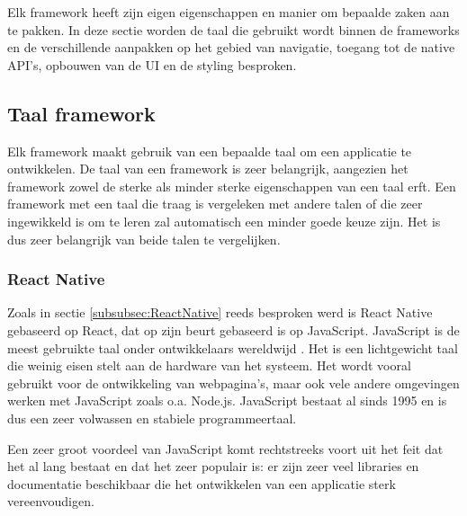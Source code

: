 Elk framework heeft zijn eigen eigenschappen en manier om bepaalde zaken aan te
pakken. In deze sectie worden de taal die gebruikt wordt binnen de frameworks en
de verschillende aanpakken op het gebied van navigatie, toegang tot de native
API's, opbouwen van de UI en de styling besproken.

\subsection{Taal framework}
\label{subsec:taalFramework}

Elk framework maakt gebruik van een bepaalde taal om een applicatie te
ontwikkelen. De taal van een framework is zeer belangrijk, aangezien het framework zowel de sterke als minder sterke eigenschappen van een taal erft. Een framework met
een taal die traag is vergeleken met andere talen of die zeer ingewikkeld is om
te leren zal automatisch een minder goede keuze zijn. Het is dus zeer belangrijk
van beide talen te vergelijken.

\subsubsection{React Native}
\label{subsubsec:taalReactNative}

Zoals in sectie \ref{subsubsec:ReactNative} reeds besproken werd is React Native
gebaseerd op React, dat op zijn beurt gebaseerd is op JavaScript. JavaScript is
de meest gebruikte taal onder ontwikkelaars wereldwijd \autocite{Liu2020a}. Het
is een lichtgewicht taal die weinig eisen stelt aan de hardware van het systeem.
Het wordt vooral gebruikt voor de ontwikkeling van webpagina's, maar ook vele
andere omgevingen werken met JavaScript zoals o.a. Node.js. JavaScript bestaat
al sinds 1995 en is dus een zeer volwassen en stabiele programmeertaal.

Een zeer groot voordeel van JavaScript komt rechtstreeks voort uit het feit dat
het al lang bestaat en dat het zeer populair is: er zijn zeer veel libraries en
documentatie beschikbaar die het ontwikkelen van een applicatie sterk
vereenvoudigen.

